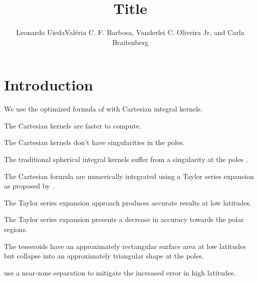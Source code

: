 \documentclass[paper,twocolumn]{geophysics}
\begin{document}
\title{Title}

\renewcommand{\thefootnote}{\fnsymbol{footnote}}
\address{
\footnotemark[1] Universidade do Estado do Rio de Janeiro,
Rio de Janeiro, Brazil.
\\
\footnotemark[2] Observat\'orio Nacional,
Rio de Janeiro, Brazil.
\\
\footnotemark[3] Department of Mathematics and Geosciences,
University of Trieste, Trieste, Italy.
}

\author{
    Leonardo Uieda\footnotemark[1]\footnotemark[2]
    Val\'eria C. F. Barbosa\footnotemark[2],
    Vanderlei C. Oliveira Jr\footnotemark[2],
    and
    Carla Braitenberg\footnotemark[3]
}

\maketitle

\begin{abstract}
\end{abstract}

\section{Introduction}


We use the optimized formula of \citet{Grombein2013} with Cartesian integral
kernels.

The Cartesian kernels are faster to compute.

The Cartesian kernels don't have singularities in the poles.

The traditional spherical integral kernels suffer from a singularity at the
poles \citep{Heck2007, Wild-Pfeiffer2008}.

The Cartesian formula are numerically integrated using a Taylor series
expansion as proposed by \citet{Heck2007}.

The Taylor series expansion approach produces accurate results at low
latitudes.

The Taylor series expansion presents a decrease in accuracy towards the polar
regions.

The tesseroids have an approximately rectangular surface area at low latitudes
but collapse into an approximately triangular shape at the poles.

\citet{Grombein2013} use a near-zone separation to mitigate the increased error
in high latitudes.
\end{document}
